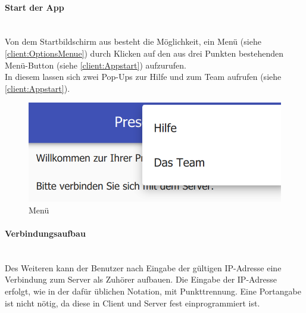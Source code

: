 \paragraph{Start der App}$\;$\\
Von dem Startbildschirm aus besteht die Möglichkeit, ein Menü (siehe \autoref{client:OptionsMenue}) durch Klicken auf den aus drei Punkten bestehenden Menü-Button (siehe \autoref{client:Appstart}) aufzurufen.
\\In diesem lassen sich zwei Pop-Ups zur Hilfe und zum Team aufrufen (siehe \autoref{client:Appstart}).
\begin{figure}[ht!]
	\centering
	\includegraphics[scale=0.5]{GUI/Bilder/Info-Menu.PNG}
	\caption{Menü{\tiny}}
	\label{client:OptionsMenue}
\end{figure}
\paragraph{Verbindungsaufbau}$\;$\\
Des Weiteren kann der Benutzer nach Eingabe der gültigen IP-Adresse eine Verbindung zum Server als Zuhörer aufbauen. Die Eingabe der IP-Adresse erfolgt, wie in der dafür üblichen Notation, mit Punkttrennung. Eine Portangabe ist nicht nötig, da diese in Client und Server fest einprogrammiert ist.

